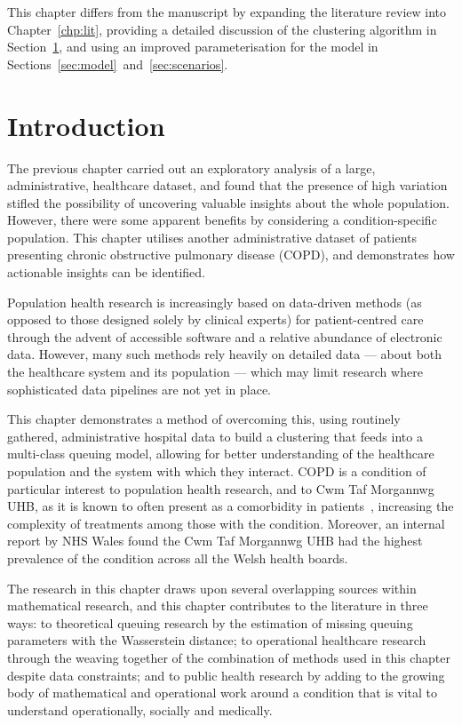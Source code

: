 \myrule%

This chapter differs from the manuscript by expanding the literature review into
Chapter~\ref{chp:lit}, providing a detailed discussion of the clustering
algorithm in Section~\ref{sec:intro}, and using an improved parameterisation for
the model in Sections~\ref{sec:model}~and~\ref{sec:scenarios}.

\section{Introduction}\label{sec:intro}

The previous chapter carried out an exploratory analysis of a large,
administrative, healthcare dataset, and found that the presence of high
variation stifled the possibility of uncovering valuable insights about the
whole population. However, there were some apparent benefits by considering a
condition-specific population. This chapter utilises another administrative
dataset of patients presenting chronic obstructive pulmonary disease (COPD), and
demonstrates how actionable insights can be identified.

Population health research is increasingly based on data-driven methods (as
opposed to those designed solely by clinical experts) for patient-centred care
through the advent of accessible software and a relative abundance of electronic
data. However, many such methods rely heavily on detailed data — about both the
healthcare system and its population — which may limit research where
sophisticated data pipelines are not yet in place.

This chapter demonstrates a method of overcoming this, using routinely gathered,
administrative hospital data to build a clustering that feeds into a multi-class
queuing model, allowing for better understanding of the healthcare population
and the system with which they interact. COPD is a condition of particular
interest to population health research, and to Cwm Taf Morgannwg UHB, as it is
known to often present as a comorbidity in patients~\cite{Houben2019},
increasing the complexity of treatments among those with the condition.
Moreover, an internal report by NHS Wales found the Cwm Taf Morgannwg UHB had
the highest prevalence of the condition across all the Welsh health boards.

The research in this chapter draws upon several overlapping sources within
mathematical research, and this chapter contributes to the literature in three
ways: to theoretical queuing research by the estimation of missing queuing
parameters with the Wasserstein distance; to operational healthcare research
through the weaving together of the combination of methods used in this chapter
despite data constraints; and to public health research by adding to the growing
body of mathematical and operational work around a condition that is vital to
understand operationally, socially and medically.

